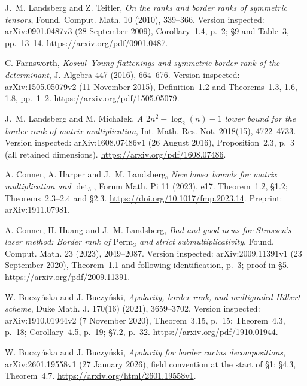 
J.~M. Landsberg and Z. Teitler,
\emph{On the ranks and border ranks of symmetric tensors},
Found. Comput. Math. 10 (2010), 339--366.
Version inspected: arXiv:0901.0487v3 (28 September 2009),
Corollary~1.4, p.~2; \S9 and Table~3, pp.~13--14.
\url{https://arxiv.org/pdf/0901.0487}.

C. Farnsworth,
\emph{Koszul--Young flattenings and symmetric border rank of the determinant},
J. Algebra 447 (2016), 664--676.
Version inspected: arXiv:1505.05079v2 (11 November 2015),
Definition~1.2 and Theorems~1.3, 1.6, 1.8, pp.~1--2.
\url{https://arxiv.org/pdf/1505.05079}.

J.~M. Landsberg and M. Micha\l ek,
\emph{A $2n^2-\log_2(n)-1$ lower bound for the border rank of matrix multiplication},
Int. Math. Res. Not. 2018(15), 4722--4733.
Version inspected: arXiv:1608.07486v1 (26 August 2016),
Proposition~2.3, p.~3 (all retained dimensions).
\url{https://arxiv.org/pdf/1608.07486}.

A. Conner, A. Harper and J.~M. Landsberg,
\emph{New lower bounds for matrix multiplication and $\operatorname{det}_3$},
Forum Math. Pi 11 (2023), e17.
Theorem~1.2, \S1.2; Theorems~2.3--2.4 and \S2.3.
\url{https://doi.org/10.1017/fmp.2023.14}.
Preprint: arXiv:1911.07981.

A. Conner, H. Huang and J.~M. Landsberg,
\emph{Bad and good news for Strassen's laser method:
Border rank of $\mathrm{Perm}_3$ and strict submultiplicativity},
Found. Comput. Math. 23 (2023), 2049--2087.
Version inspected: arXiv:2009.11391v1 (23 September 2020),
Theorem~1.1 and following identification, p.~3; proof in \S5.
\url{https://arxiv.org/pdf/2009.11391}.

W. Buczy\'nska and J. Buczy\'nski,
\emph{Apolarity, border rank, and multigraded Hilbert scheme},
Duke Math. J. 170(16) (2021), 3659--3702.
Version inspected: arXiv:1910.01944v2 (7 November 2020),
Theorem~3.15, p.~15; Theorem~4.3, p.~18; Corollary~4.5,
p.~19; \S7.2, p.~32.
\url{https://arxiv.org/pdf/1910.01944}.

W. Buczy\'nska and J. Buczy\'nski,
\emph{Apolarity for border cactus decompositions},
arXiv:2601.19558v1 (27 January 2026),
field convention at the start of \S1; \S4.3, Theorem~4.7.
\url{https://arxiv.org/html/2601.19558v1}.

